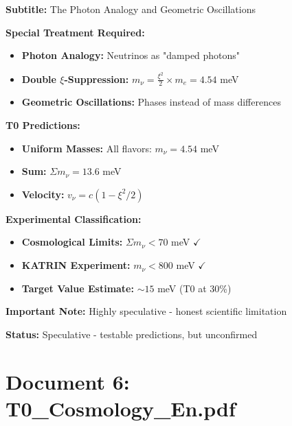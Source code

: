 \documentclass[12pt,a4paper]{article}
\newcommand{\xipar}{\xi}
\begin{document}
	\begin{documentbox}
		\textbf{Subtitle:} The Photon Analogy and Geometric Oscillations
		
		\textbf{Special Treatment Required:}
		\begin{itemize}
			\item \textbf{Photon Analogy:} Neutrinos as "damped photons"
			\item \textbf{Double $\xi$-Suppression:} $m_\nu = \frac{\xipar^2}{2} \times m_e = 4.54$ meV
			\item \textbf{Geometric Oscillations:} Phases instead of mass differences
		\end{itemize}
		
		\textbf{T0 Predictions:}
		\begin{itemize}
			\item \textbf{Uniform Masses:} All flavors: $m_\nu = 4.54$ meV
			\item \textbf{Sum:} $\Sigma m_\nu = 13.6$ meV
			\item \textbf{Velocity:} $v_\nu = c(1 - \xipar^2/2)$
		\end{itemize}
		
		\textbf{Experimental Classification:}
		\begin{itemize}
			\item \textbf{Cosmological Limits:} $\Sigma m_\nu < 70$ meV $\checkmark$
			\item \textbf{KATRIN Experiment:} $m_\nu < 800$ meV $\checkmark$
			\item \textbf{Target Value Estimate:} $\sim 15$ meV (T0 at 30\%)
		\end{itemize}
		
		\textbf{Important Note:} Highly speculative - honest scientific limitation
		
		\textbf{Status:} Speculative - testable predictions, but unconfirmed
	\end{documentbox}
	
	\section{Document 6: T0\_Cosmology\_En.pdf}
	
\end{document}
